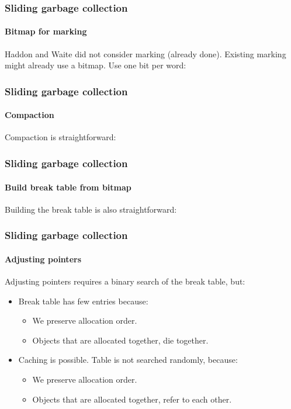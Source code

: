 \documentclass{beamer}
\def\inputfig#1{}
\begin{document}
\begin{frame}
  \frametitle{Sliding garbage collection} 
  \framesubtitle{Bitmap for marking}

  Haddon and Waite did not consider marking (already done).  Existing
  marking might already use a bitmap.
  \vskip 1cm
  Use one bit per word:

  \begin{center}
\inputfig{fig-example-a.pdf_t}
  \end{center}
\end{frame}
\begin{frame}
  \frametitle{Sliding garbage collection} 
  \framesubtitle{Compaction}

  Compaction is straightforward:

  \begin{center}
\inputfig{fig-example-b.pdf_t}
  \end{center}

  \begin{center}
\inputfig{fig-example-c.pdf_t}
  \end{center}

\end{frame}
\begin{frame}
  \frametitle{Sliding garbage collection} 
  \framesubtitle{Build break table from bitmap}

  Building the break table is also straightforward:

  \begin{center}
\inputfig{fig-example-d.pdf_t}
  \end{center}

\end{frame}
\begin{frame}
  \frametitle{Sliding garbage collection} 
  \framesubtitle{Adjusting pointers}

  Adjusting pointers requires a binary search of the break table, but: 

  \begin{itemize}
  \item Break table has few entries because:
    \begin{itemize}
    \item We preserve allocation order.
    \item Objects that are allocated together, die together.
    \end{itemize}
  \item Caching is possible.  Table is not searched randomly, because: 
    \begin{itemize}
    \item We preserve allocation order.
    \item Objects that are allocated together, refer to each other.
    \end{itemize}
  \end{itemize}

\end{frame}
\end{document}
